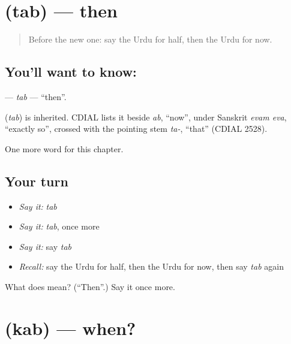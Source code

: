 \section[\texorpdfstring{\ur{تب} (tab)}{تب (tab)}]{ (tab) — then}

\label{lesson:UR-C93-tab}



\begin{quote}
Before the new one: say the Urdu for half, then the Urdu for now.
\end{quote}

\subsection*{You'll want to know: }
\textbf{} — \emph{tab} — \textquotedblleft{}then\textquotedblright{}.

\begin{cousinweb}
\textbf{} (\emph{tab}) is inherited. CDIAL lists it beside \emph{ab}, \textquotedblleft{}now\textquotedblright{}, under Sanskrit \emph{evam eva}, \textquotedblleft{}exactly so\textquotedblright{}, crossed with the pointing stem \emph{ta-}, \textquotedblleft{}that\textquotedblright{} (CDIAL 2528).
\end{cousinweb}

\begin{grammarlens}[title={What you've built}]
One more word for this chapter.
\end{grammarlens}

\subsection*{Your turn}
\begin{itemize}
\raggedright
  \item \emph{Say it:} \emph{tab}
  \item \emph{Say it:} \emph{tab}, once more
  \item \emph{Say it:} say \emph{tab}
  \item \emph{Recall:} say the Urdu for half, then the Urdu for now, then say \emph{tab} again
\end{itemize}

\begin{tcolorbox}[breakable,colback=teal!4,colframe=teal!35!black,title={Before you move on}]
What does  mean? (\textquotedblleft{}Then\textquotedblright{}.) Say it once more.
\end{tcolorbox}
\section[\texorpdfstring{\ur{کب} (kab)}{کب (kab)}]{ (kab) — when?}

